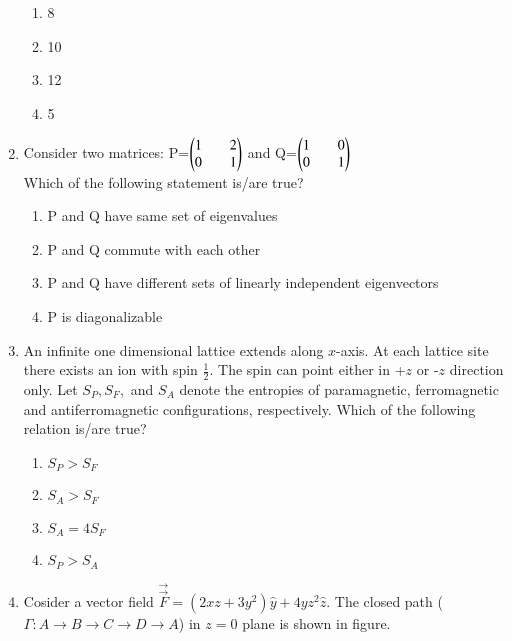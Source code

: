 \documentclass[journal]{IEEEtran}
\begin{document}
\begin{enumerate}
    \begin{enumerate}
        \item 8
        \item 10
        \item 12
        \item 5
    \end{enumerate}
    \item Consider two matrices: P=$\begin{pmatrix} 1 && 2 \\ 0 && 1\end{pmatrix}$ and Q=$\begin{pmatrix}1 && 0 \\ 0 && 1\end{pmatrix}$ \\
    Which of the following statement is/are true?
    \begin{enumerate}
        \item P and Q have same set of eigenvalues
        \item P and Q commute with each other
        \item P and Q have different sets of linearly independent eigenvectors
        \item P is diagonalizable
    \end{enumerate}
    \item An infinite one dimensional lattice extends along $x$-axis. At each lattice site there
exists an ion with spin $\frac{1}{2}$. The spin can point either in +$z$ or -$z$ direction only. Let
$S_P, S_F,$ and $S_A$ denote the entropies of paramagnetic, ferromagnetic and
antiferromagnetic configurations, respectively. Which of the following relation is/are true?
\begin{enumerate}
    \item $S_P>S_F$
    \item $S_A>S_F$
    \item $S_A=4S_F$
    \item $S_P>S_A$
\end{enumerate}
\item Cosider a vector field $\Vec{\overrightarrow{F}}=(2xz+3y^2)\hat{y}+4yz^2\hat{z}$. The closed path 
($\Gamma:A\rightarrow B\rightarrow C\rightarrow D\rightarrow A$) in $z=0$ plane is shown in figure. \\
\begin{figure}[H]
    \centering
    
\end{figure}


\end{enumerate}
\end{document}
